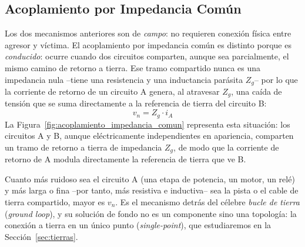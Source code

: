 \subsection{Acoplamiento por Impedancia Común}\label{sub:acoplamiento_impedancia_comun}

Los dos mecanismos anteriores son de \emph{campo}: no requieren conexión física entre agresor y víctima. El acoplamiento por impedancia común es distinto porque es \emph{conducido}: ocurre cuando dos circuitos comparten, aunque sea parcialmente, el mismo camino de retorno a tierra. Ese tramo compartido nunca es una impedancia nula --tiene una resistencia y una inductancia parásita $Z_g$-- por lo que la corriente de retorno de un circuito A genera, al atravesar $Z_g$, una caída de tensión que se suma directamente a la referencia de tierra del circuito B:
\begin{equation}\label{eq:acoplo_impedancia_comun}
    v_n = Z_g \cdot i_A
\end{equation}
La Figura~\ref{fig:acoplamiento_impedancia_comun} representa esta situación: los circuitos A y B, aunque eléctricamente independientes en apariencia, comparten un tramo de retorno a tierra de impedancia $Z_g$, de modo que la corriente de retorno de A modula directamente la referencia de tierra que ve B.

\begin{marginfigure}
    \centering
    \shorthandoff{>}
    \caption[Modelo del acoplamiento por impedancia común.]{Modelo del acoplamiento por impedancia común. Los retornos de los circuitos A y B comparten un tramo de tierra con impedancia $Z_g$; la corriente de retorno de A ($i_A$) contamina la referencia de B con una tensión $v_n = Z_g\, i_A$.}\label{fig:acoplamiento_impedancia_comun}
\end{marginfigure}

Cuanto más ruidoso sea el circuito A (una etapa de potencia, un motor, un relé) y más larga o fina --por tanto, más resistiva e inductiva-- sea la pista o el cable de tierra compartido, mayor es $v_n$. Es el mecanismo detrás del célebre \emph{bucle de tierra} (\textit{ground loop}), y su solución de fondo no es un componente sino una topología: la conexión a tierra en un único punto (\textit{single-point}), que estudiaremos en la Sección~\ref{sec:tierras}.

